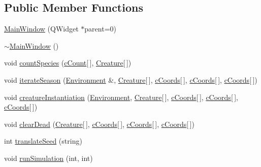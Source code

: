 \subsection*{Public Member Functions}
\begin{DoxyCompactItemize}
\item 
\hyperlink{class_main_window_a8b244be8b7b7db1b08de2a2acb9409db}{Main\+Window} (Q\+Widget $\ast$parent=0)
\item 
\hyperlink{class_main_window_ae98d00a93bc118200eeef9f9bba1dba7}{$\sim$\+Main\+Window} ()
\item 
void \hyperlink{class_main_window_ae6900ae41d5504ba5fd5bebd94c091a8}{count\+Species} (\hyperlink{struct_main_window_1_1c_count}{c\+Count}\mbox{[}$\,$\mbox{]}, \hyperlink{class_creature}{Creature}\mbox{[}$\,$\mbox{]})
\item 
void \hyperlink{class_main_window_a6d41dd2f999fb6fef9b4de0b93e5e93e}{iterate\+Season} (\hyperlink{class_environment}{Environment} \&, \hyperlink{class_creature}{Creature}\mbox{[}$\,$\mbox{]}, \hyperlink{struct_main_window_1_1c_coords}{c\+Coords}\mbox{[}$\,$\mbox{]}, \hyperlink{struct_main_window_1_1c_coords}{c\+Coords}\mbox{[}$\,$\mbox{]}, \hyperlink{struct_main_window_1_1c_coords}{c\+Coords}\mbox{[}$\,$\mbox{]})
\item 
void \hyperlink{class_main_window_a212560b975aacf3247ee109797f99941}{creature\+Instantiation} (\hyperlink{class_environment}{Environment}, \hyperlink{class_creature}{Creature}\mbox{[}$\,$\mbox{]}, \hyperlink{struct_main_window_1_1c_coords}{c\+Coords}\mbox{[}$\,$\mbox{]}, \hyperlink{struct_main_window_1_1c_coords}{c\+Coords}\mbox{[}$\,$\mbox{]}, \hyperlink{struct_main_window_1_1c_coords}{c\+Coords}\mbox{[}$\,$\mbox{]})
\item 
void \hyperlink{class_main_window_a9be9fbd759eb5d1efe76f94d3e16fdc3}{clear\+Dead} (\hyperlink{class_creature}{Creature}\mbox{[}$\,$\mbox{]}, \hyperlink{struct_main_window_1_1c_coords}{c\+Coords}\mbox{[}$\,$\mbox{]}, \hyperlink{struct_main_window_1_1c_coords}{c\+Coords}\mbox{[}$\,$\mbox{]}, \hyperlink{struct_main_window_1_1c_coords}{c\+Coords}\mbox{[}$\,$\mbox{]})
\item 
int \hyperlink{class_main_window_a293a993c9290abb989bedd05501e838d}{translate\+Seed} (string)
\item 
void \hyperlink{class_main_window_abfdebc0fe2713bd3157ea166ab6bb0d5}{run\+Simulation} (int, int)
\end{DoxyCompactItemize}
